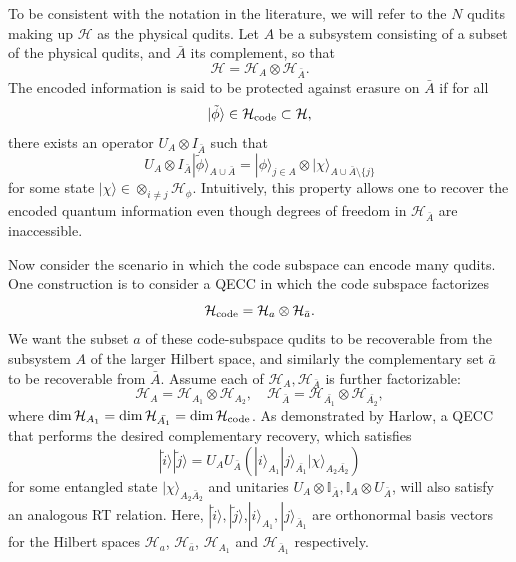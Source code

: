 \documentclass[%
preprint,
nofootinbib,
amsmath,amssymb,
aps,
prd,
showpacs,
superscriptaddress
]{revtex4-1}
\begin{document}
To be consistent with the notation in the literature, we will refer to the $N$ qudits making up $\mathcal{H}$ as the physical qudits. 
Let $A$ be a subsystem consisting of a subset of the physical qudits, and $\bar{A}$ its complement, so that 
\begin{equation}
\mathcal{H}=\mathcal{H}_{A}\otimes\mathcal{H}_{\bar{A}}.  
\end{equation}
The encoded information is said to be protected against erasure on $\bar{A}$ if for all 
\begin{equation}
|\tilde{\phi}\rangle\in \mathcal{H}_{\rm code}\subset\mathcal{H},
\end{equation} 
there exists an operator $U_{A}\otimes I_{\bar{A}}$ such that 
\begin{equation}
 U_{A}\otimes I_{\bar{A}}|\tilde{\phi}\rangle_{A\cup\bar{A}} = |\phi\rangle_{j\in A} \otimes|\chi\rangle_{A\cup\bar{A}\setminus\{j\}}
\end{equation}
for some state $|\chi\rangle \in \otimes_{i\neq j}\mathcal{H_\phi}$.
Intuitively, this property allows one to recover the encoded quantum information even though degrees of freedom in $\mathcal{H}_{\bar{A}}$ are inaccessible.

Now consider the scenario in which the code subspace can encode many qudits. One construction is to consider a QECC in which the code subspace factorizes
\begin{equation}
\mathcal{H}_{\rm code}=\mathcal{H}_a\otimes\mathcal{H}_{\bar{a}}.
\end{equation} 
We want the subset $a$ of these code-subspace qudits to be recoverable from the subsystem $A$ of the larger Hilbert space, and similarly the complementary set $\bar{a}$ to be recoverable from $\bar{A}$. Assume each of $\mathcal{H}_{A}, \mathcal{H}_{\bar{A}}$ is further factorizable: 
\begin{equation}
\mathcal{H}_A=\mathcal{H}_{A_1}\otimes \mathcal{H}_{A_2}, \quad \mathcal{H}_{\bar{A}}=\mathcal{H}_{\bar{A_1}}\otimes \mathcal{H}_{\bar{A_2}}, 
\end{equation}
where $\dim \mathcal{H}_{A_1} = \dim\mathcal{H}_{\bar{A_1}} = \dim \mathcal{H}_{\rm code}$. 
As demonstrated by Harlow, a QECC that performs the desired complementary recovery, which satisfies  
\begin{equation}
 |\tilde{i}\rangle| \tilde{j} \rangle = U_{A} U_{\bar{A}}(|i\rangle_{A_1}|j\rangle_{\bar{A_1}}|\chi\rangle_{A_2\bar{A_2}})
\end{equation}
for some entangled state $|\chi\rangle_{A_2\bar{A}_2}$ and unitaries $U_A\otimes \mathbb{I}_{\bar{A}}, \mathbb{I}_{A}\otimes U_{\bar{A}}$, will also satisfy an analogous RT relation. 
Here, $|\tilde{i}\rangle, |\tilde{j}\rangle$,$|i\rangle_{A_1}, |j\rangle_{\bar{A}_1}$ are orthonormal basis vectors for the Hilbert spaces $\mathcal{H}_{a}$, $\mathcal{H}_{\bar{a}}$, $\mathcal{H}_{A_1}$ and $\mathcal{H}_{\bar{A}_1}$ respectively. 
\end{document}
